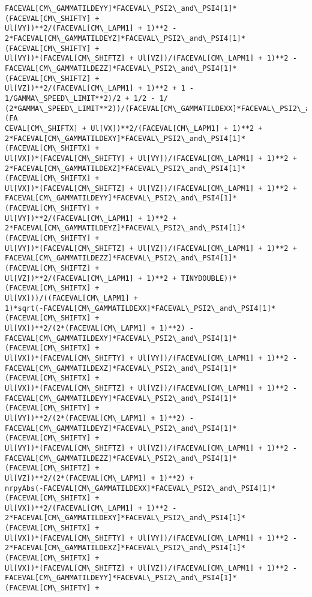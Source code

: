 \documentclass[landscape,letterpaper,10pt,english]{article}
\begin{document}
\begin{Verbatim}[commandchars=\\\{\}]
FACEVAL[CM\_GAMMATILDEYY]*FACEVAL\_PSI2\_and\_PSI4[1]*(FACEVAL[CM\_SHIFTY] +
Ul[VY])**2/(FACEVAL[CM\_LAPM1] + 1)**2 -
2*FACEVAL[CM\_GAMMATILDEYZ]*FACEVAL\_PSI2\_and\_PSI4[1]*(FACEVAL[CM\_SHIFTY] +
Ul[VY])*(FACEVAL[CM\_SHIFTZ] + Ul[VZ])/(FACEVAL[CM\_LAPM1] + 1)**2 -
FACEVAL[CM\_GAMMATILDEZZ]*FACEVAL\_PSI2\_and\_PSI4[1]*(FACEVAL[CM\_SHIFTZ] +
Ul[VZ])**2/(FACEVAL[CM\_LAPM1] + 1)**2 + 1 - 1/GAMMA\_SPEED\_LIMIT**2)/2 + 1/2 - 1/
(2*GAMMA\_SPEED\_LIMIT**2))/(FACEVAL[CM\_GAMMATILDEXX]*FACEVAL\_PSI2\_and\_PSI4[1]*(FA
CEVAL[CM\_SHIFTX] + Ul[VX])**2/(FACEVAL[CM\_LAPM1] + 1)**2 +
2*FACEVAL[CM\_GAMMATILDEXY]*FACEVAL\_PSI2\_and\_PSI4[1]*(FACEVAL[CM\_SHIFTX] +
Ul[VX])*(FACEVAL[CM\_SHIFTY] + Ul[VY])/(FACEVAL[CM\_LAPM1] + 1)**2 +
2*FACEVAL[CM\_GAMMATILDEXZ]*FACEVAL\_PSI2\_and\_PSI4[1]*(FACEVAL[CM\_SHIFTX] +
Ul[VX])*(FACEVAL[CM\_SHIFTZ] + Ul[VZ])/(FACEVAL[CM\_LAPM1] + 1)**2 +
FACEVAL[CM\_GAMMATILDEYY]*FACEVAL\_PSI2\_and\_PSI4[1]*(FACEVAL[CM\_SHIFTY] +
Ul[VY])**2/(FACEVAL[CM\_LAPM1] + 1)**2 +
2*FACEVAL[CM\_GAMMATILDEYZ]*FACEVAL\_PSI2\_and\_PSI4[1]*(FACEVAL[CM\_SHIFTY] +
Ul[VY])*(FACEVAL[CM\_SHIFTZ] + Ul[VZ])/(FACEVAL[CM\_LAPM1] + 1)**2 +
FACEVAL[CM\_GAMMATILDEZZ]*FACEVAL\_PSI2\_and\_PSI4[1]*(FACEVAL[CM\_SHIFTZ] +
Ul[VZ])**2/(FACEVAL[CM\_LAPM1] + 1)**2 + TINYDOUBLE))*(FACEVAL[CM\_SHIFTX] +
Ul[VX]))/((FACEVAL[CM\_LAPM1] +
1)*sqrt(-FACEVAL[CM\_GAMMATILDEXX]*FACEVAL\_PSI2\_and\_PSI4[1]*(FACEVAL[CM\_SHIFTX] +
Ul[VX])**2/(2*(FACEVAL[CM\_LAPM1] + 1)**2) -
FACEVAL[CM\_GAMMATILDEXY]*FACEVAL\_PSI2\_and\_PSI4[1]*(FACEVAL[CM\_SHIFTX] +
Ul[VX])*(FACEVAL[CM\_SHIFTY] + Ul[VY])/(FACEVAL[CM\_LAPM1] + 1)**2 -
FACEVAL[CM\_GAMMATILDEXZ]*FACEVAL\_PSI2\_and\_PSI4[1]*(FACEVAL[CM\_SHIFTX] +
Ul[VX])*(FACEVAL[CM\_SHIFTZ] + Ul[VZ])/(FACEVAL[CM\_LAPM1] + 1)**2 -
FACEVAL[CM\_GAMMATILDEYY]*FACEVAL\_PSI2\_and\_PSI4[1]*(FACEVAL[CM\_SHIFTY] +
Ul[VY])**2/(2*(FACEVAL[CM\_LAPM1] + 1)**2) -
FACEVAL[CM\_GAMMATILDEYZ]*FACEVAL\_PSI2\_and\_PSI4[1]*(FACEVAL[CM\_SHIFTY] +
Ul[VY])*(FACEVAL[CM\_SHIFTZ] + Ul[VZ])/(FACEVAL[CM\_LAPM1] + 1)**2 -
FACEVAL[CM\_GAMMATILDEZZ]*FACEVAL\_PSI2\_and\_PSI4[1]*(FACEVAL[CM\_SHIFTZ] +
Ul[VZ])**2/(2*(FACEVAL[CM\_LAPM1] + 1)**2) +
nrpyAbs(-FACEVAL[CM\_GAMMATILDEXX]*FACEVAL\_PSI2\_and\_PSI4[1]*(FACEVAL[CM\_SHIFTX] +
Ul[VX])**2/(FACEVAL[CM\_LAPM1] + 1)**2 -
2*FACEVAL[CM\_GAMMATILDEXY]*FACEVAL\_PSI2\_and\_PSI4[1]*(FACEVAL[CM\_SHIFTX] +
Ul[VX])*(FACEVAL[CM\_SHIFTY] + Ul[VY])/(FACEVAL[CM\_LAPM1] + 1)**2 -
2*FACEVAL[CM\_GAMMATILDEXZ]*FACEVAL\_PSI2\_and\_PSI4[1]*(FACEVAL[CM\_SHIFTX] +
Ul[VX])*(FACEVAL[CM\_SHIFTZ] + Ul[VZ])/(FACEVAL[CM\_LAPM1] + 1)**2 -
FACEVAL[CM\_GAMMATILDEYY]*FACEVAL\_PSI2\_and\_PSI4[1]*(FACEVAL[CM\_SHIFTY] +

\end{Verbatim}
\end{document}
